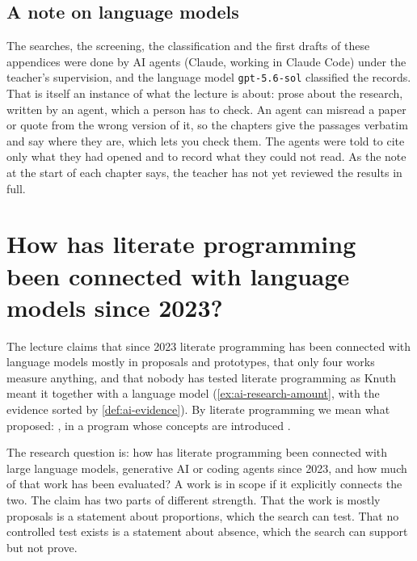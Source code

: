 \section{A note on language models}

The searches, the screening, the classification and the first drafts of these
appendices were done by AI agents (Claude, working in Claude Code) under the
teacher's supervision, and the language model \texttt{gpt-5.6-sol} classified
the records.
That is itself an instance of what the lecture is about: prose about the
research, written by an agent, which a person has to check.
An agent can misread a paper or quote from the wrong version of it, so the
chapters give the passages verbatim and say where they are, which lets you
check them.
The agents were told to cite only what they had opened and to record what they
could not read.
As the note at the start of each chapter says, the teacher has not yet reviewed
the results in full.


\chapter{How has literate programming been connected with language models
  since 2023?}
\label{app:ai-rq1}

The lecture claims that since 2023 literate programming has been connected with
language models mostly in proposals and prototypes, that only four works
measure anything, and that nobody has tested literate programming as Knuth
meant it together with a language model (\cref{ex:ai-research-amount}, with the
evidence sorted by \cref{def:ai-evidence}).
By literate programming we mean what \textcite{Knuth1984} proposed:
, in a program whose concepts are introduced
.

The research question is: how has literate programming been connected with
large language models, generative AI or coding agents since 2023, and how much
of that work has been evaluated?
A work is in scope if it explicitly connects the two.
The claim has two parts of different strength.
That the work is mostly proposals is a statement about proportions, which the
search can test.
That no controlled test exists is a statement about absence, which the search
can support but not prove.

